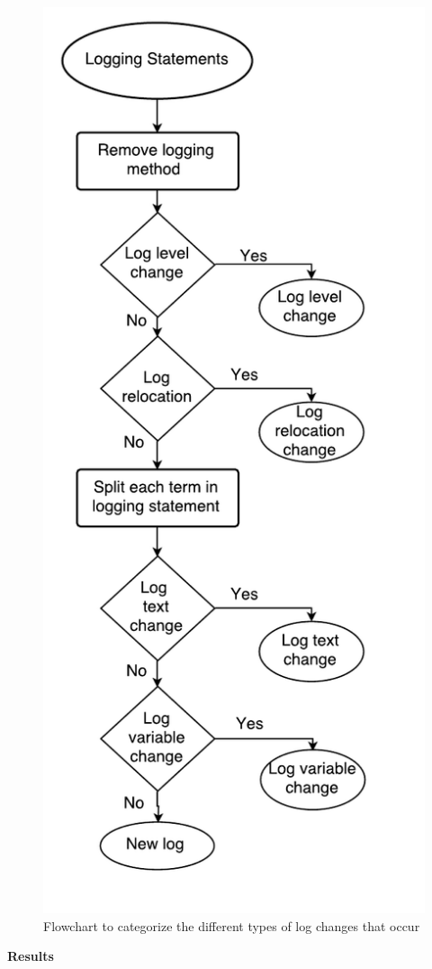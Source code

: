 \begin{figure}[tb]
	\centering
	\includegraphics[width=0.75\linewidth]{Flowchart2}
	\caption{Flowchart to categorize the different types of log changes that occur}
	\label{fig:Flowchart2}
\end{figure}


\noindent \textbf{Results}

